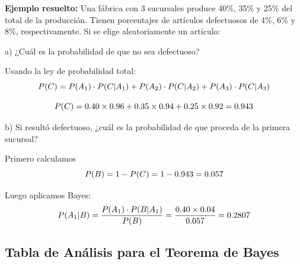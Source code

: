 \documentclass[
  spanish,
  letterpaper,
]{book}
\begin{document}
\textbf{Ejemplo resuelto:} Una fábrica con 3 sucursales produce 40\%,
35\% y 25\% del total de la producción. Tienen porcentajes de artículos
defectuosos de 4\%, 6\% y 8\%, respectivamente. Si se elige
aleatoriamente un artículo:

a) ¿Cuál es la probabilidad de que no sea defectuoso?

Usando la ley de probabilidad total:\\
\[\large P(C) = P(A_1) \cdot P(C|A_1) + P(A_2) \cdot P(C|A_2) + P(A_3) \cdot P(C|A_3)\]

\[\large P(C) = 0.40 \times 0.96 + 0.35 \times 0.94 + 0.25 \times 0.92 = 0.943\]

b) Si resultó defectuoso, ¿cuál es la probabilidad de que proceda de la
primera sucursal?

Primero calculamos \[\Large P(B) = 1 - P(C) = 1 - 0.943 = 0.057\]

Luego aplicamos Bayes:\\
\[\Large P(A_1|B) = \frac{P(A_1) \cdot P(B|A_1)}{P(B)} = \frac{0.40 \times 0.04}{0.057} = 0.2807\]

\subsection{Tabla de Análisis para el Teorema de
Bayes}\label{tabla-de-anuxe1lisis-para-el-teorema-de-bayes}
\end{document}
